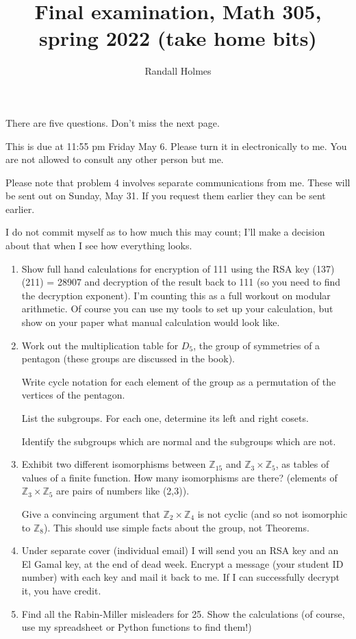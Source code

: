 \documentclass[12pt]{article}
\title{Final examination, Math 305, spring 2022 (take home bits)}
\author{Randall Holmes}
\begin{document}
\maketitle

There are five questions.  Don't miss the next page.

This is due at 11:55 pm Friday May 6.  Please turn it in electronically to me.  You are not allowed to consult any other person but me.

Please note that problem 4 involves separate communications from me.  These will be sent out on Sunday, May 31.  If you request them earlier they can be sent earlier.

I do not commit myself as to how much this may count;  I'll make a decision about that when I see how everything looks.

\begin{enumerate}

\item  Show full hand calculations for encryption of 111 using the RSA key (137)(211) = 28907 and decryption of the result back to 111 (so you need to find the decryption exponent).  I'm counting this as a full workout on modular arithmetic.  Of course you can use my tools to set up your calculation, but show on your paper what manual calculation would look like.

\item  Work out the multiplication table for $D_5$, the group of symmetries of a pentagon (these groups are discussed in the book).

Write cycle notation for each element of the group as a permutation of the vertices of the pentagon.

List the subgroups.  For each one, determine its left and right cosets.

Identify the subgroups which are normal and the subgroups which are not.

\item  Exhibit two different isomorphisms between $\mathbb Z_{15}$ and $\mathbb Z_3 \times \mathbb Z_5$, as tables of values of a finite function.
How many isomorphisms are there?  (elements of $\mathbb Z_3 \times \mathbb Z_5$ are pairs of numbers like (2,3)).

Give a convincing argument that $\mathbb Z_2 \times \mathbb Z_4$ is not cyclic (and so not isomorphic to $\mathbb Z_8$).  This should use simple facts about the group, not Theorems.

\item  Under separate cover (individual email) I will send you an RSA key and an El Gamal key, at the end of dead week.  Encrypt a message (your student ID number) with each key
and mail it back to me.  If I can successfully decrypt it, you have credit.

\item  Find all the Rabin-Miller misleaders for 25.  Show the calculations (of course, use my spreadsheet or Python functions to find them!)

\end{enumerate}
\end{document}

